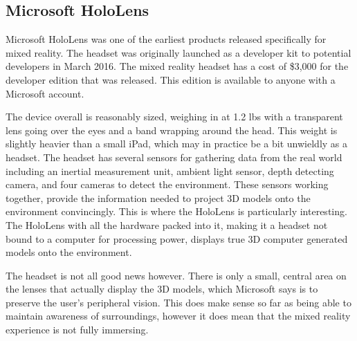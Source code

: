 \documentclass[10pt,draftclsnofoot,onecolumn,letterpaper]{IEEEtran}
\begin{document}
\subsection{Microsoft HoloLens}
Microsoft HoloLens was one of the earliest products released specifically for mixed reality. The headset was originally launched as a developer kit to potential developers in March 2016. The mixed reality headset has a cost of \$3,000 for the developer edition that was released\cite{HL}. This edition is available to anyone with a Microsoft account.\par
The device overall is reasonably sized, weighing in at 1.2 lbs with a transparent lens going over the eyes and a band wrapping around the head\cite{HLspecs}. This weight is slightly heavier than a small iPad, which may in practice be a bit unwieldly as a headset. The headset has several sensors for gathering data from the real world including an inertial measurement unit, ambient light sensor, depth detecting camera, and four cameras to detect the environment\cite{HL}. These sensors working together, provide the information needed to project 3D models onto the environment convincingly. This is where the HoloLens is particularly interesting. The HoloLens with all the hardware packed into it, making it a headset not bound to a computer for processing power, displays true 3D computer generated models onto the environment\cite{HL}.\par
The headset is not all good news however. There is only a small, central area on the lenses that actually display the 3D models, which Microsoft says is to preserve the user's peripheral vision\cite{HLpromo}. This does make sense so far as being able to maintain awareness of surroundings, however it does mean that the mixed reality experience is not fully immersing.\par
\end{document}
